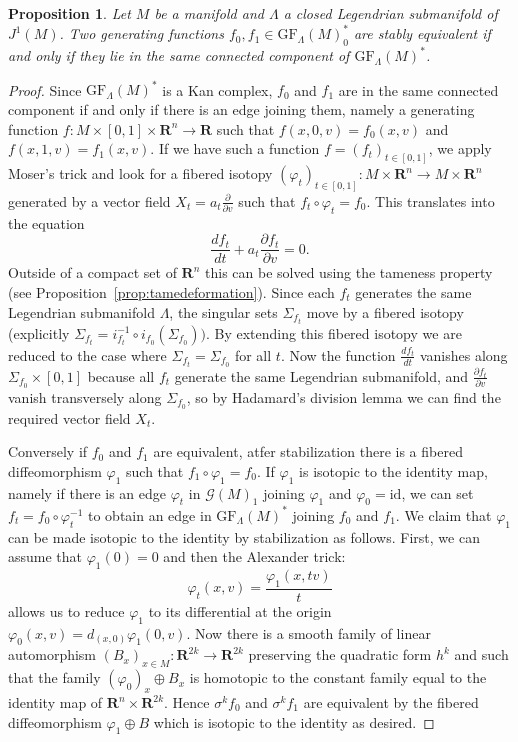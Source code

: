 \documentclass[12pt,a4paper]{article}
\numberwithin{equation}{section}
\newtheorem{prop}[equation]{Proposition}
\theoremstyle{definition}
\theoremstyle{remark}
\newcommand{\R}{\mathbf{R}}
\newcommand{\del}{\partial}
\newcommand{\id}{\mathrm{id}}
\newcommand{\G}{\mathcal{G}}
\newcommand{\GF}{\mathrm{GF}}
\begin{document}
\begin{prop}\label{prop:pi_0=equiv}
Let $M$ be a manifold and $\Lambda$ a closed Legendrian submanifold of $J^1(M)$.
Two generating functions $f_0,f_1\in \GF_\Lambda(M)^*_0$ are stably equivalent if and only if they lie
in the same connected component of $\GF_\Lambda(M)^*$.
\end{prop}
\begin{proof}
Since $\GF_{\Lambda}(M)^*$ is a Kan complex, $f_0$ and $f_1$ are in the same connected component if and only if there
is an edge joining them, namely a generating function $f:M\times [0,1]\times \R^n\to \R$
such that $f(x,0,v)=f_0(x,v)$ and $f(x,1,v)=f_1(x,v)$.
If we have such a function $f=(f_t)_{t\in [0,1]}$, we apply Moser's trick and look for a fibered isotopy $(\varphi_t)_{t\in[0,1]}:M\times \R^n \to M\times \R^n$
generated by a vector field $X_t=a_t\frac{\del}{\del v}$ such that $f_t\circ \varphi_t=f_0$. This translates into the equation
\[\frac{d f_t}{dt} + a_t\frac{\del f_t}{\del v}=0.\]
Outside of a compact set of $\R^n$ this can be solved using the tameness property (see Proposition~\ref{prop:tamedeformation}).
Since each $f_t$ generates the same Legendrian submanifold $\Lambda$, the singular sets $\Sigma_{f_t}$
move by a fibered isotopy (explicitly $\Sigma_{f_t}=i_{f_t}^{-1}\circ i_{f_0}(\Sigma_{f_0}))$. By extending this fibered isotopy
we are reduced to the case where $\Sigma_{f_t}=\Sigma_{f_0}$ for all $t$. Now the function $\frac{d f_t}{d t}$ vanishes
along $\Sigma_{f_0}\times [0,1]$ because all $f_t$ generate the same Legendrian submanifold, and $\frac{\del f_t}{\del v}$
vanish transversely along $\Sigma_{f_0}$, so by Hadamard's division lemma we can find the required vector field $X_t$.

Conversely if $f_0$ and $f_1$ are equivalent, atfer stabilization there is a fibered diffeomorphism $\varphi_1$
such that $f_1\circ \varphi_1=f_0$. If $\varphi_1$ is isotopic to the identity map, namely if there is an edge
$\varphi_t$ in $\G(M)_1$ joining $\varphi_1$ and $\varphi_0=\id$, we can set $f_t=f_0\circ \varphi_t^{-1}$
to obtain an edge in $\GF_\Lambda(M)^*$ joining $f_0$ and $f_1$. We claim that $\varphi_1$ can be made isotopic to the identity
by stabilization as follows. First, we can assume that $\varphi_1(0)=0$ and then the Alexander trick:
\[\varphi_t(x,v)=\frac{\varphi_1(x,tv)}{t}\]
allows us to reduce $\varphi_1$ to its differential at the origin $\varphi_0(x,v)=d_{(x,0)}\varphi_1(0,v)$.
Now there is a smooth family of linear automorphism $(B_x)_{x\in M}:\R^{2k}\to \R^{2k}$ preserving the quadratic form
$h^k$ and such that the family $(\varphi_0)_x\oplus B_x$ is homotopic to the constant family equal to the identity map of $\R^n\times \R^{2k}$.
Hence $\sigma^k f_0$ and $\sigma^k f_1$ are equivalent by the fibered diffeomorphism $\varphi_1 \oplus B$ which is isotopic
to the identity as desired.
\end{proof}
\end{document}
